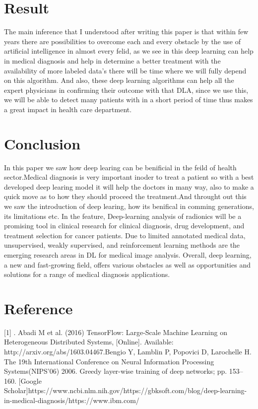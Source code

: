 \documentclass{article,17 pt}
\begin{document}
\section*{Result  }


The main inference that I understood after writing this paper is that within few years there are possibilities to overcome each and every obstacle by the use of artificial intelligence in almost every felid, as we see in this deep learning can help in medical diagnosis and help in determine a better treatment with the availability of more labeled data's there will be time where we will fully depend on this algorithm. And also, these deep learning algorithms can help all the expert physicians in confirming their outcome with that DLA, since we use this, we will be able to detect many patients with in a short period of time thus makes a great impact in health care department. 
\newpage

\section*{Conclusion}
In this paper we saw how deep learing can be benificial  in the feild of health sector.Medical diagnosis is very important inoder to treat a patient so with a best developed  deep learing model it will help the doctors in many way, also to make a quick move as to how they should proceed the treatment.And throught out this we saw the introduction of deep learing, how its benifical in comming generations, its limitations etc. In the feature, Deep-learning analysis of radionics will be a promising tool in clinical research for clinical diagnosis, drug development, and treatment selection for cancer patients. Due to limited annotated medical data, unsupervised, weakly supervised, and reinforcement learning methods are the emerging research areas in DL for medical image analysis. Overall, deep learning, a new and fast-growing field, offers various obstacles as well as opportunities and solutions for a range of medical diagnosis applications.


\section*{Reference}
[1]  . Abadi M et al. (2016) TensorFlow: Large-Scale Machine Learning on Heterogeneous Distributed Systems, [Online]. Available: http://arxiv.org/abs/1603.04467.\newline
[2] Bengio Y, Lamblin P, Popovici D, Larochelle H. The 19th International Conference on Neural Information Processing Systems(NIPS’06) 2006. Greedy layer-wise training of deep networks; pp. 153–160. [Google Scholar]\newline
[3] https://www.ncbi.nlm.nih.gov/\newline
[4]https://gbksoft.com/blog/deep-learning-in-medical-diagnosis/\newline
[5]https://www.ibm.com/\newline
\end{document}
